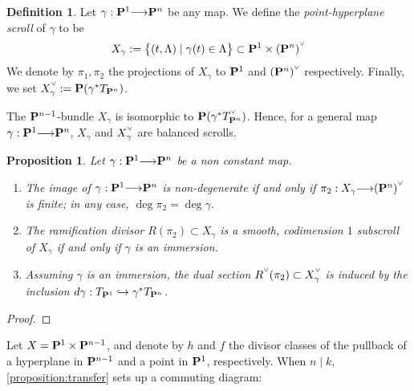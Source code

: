 \documentclass[11pt,reqno]{amsart}
\theoremstyle{plain}
\newtheorem{proposition}[theorem]{Proposition}
\theoremstyle{definition}
\newtheorem{definition}[theorem]{Definition}
\theoremstyle{remark}
\numberwithin{equation}{section}
\newcommand{\todo}[1]{\fbox{ToDo: #1}}
\renewcommand{\to}{{\longrightarrow}}
\numberwithin{equation}{section}
\newcommand{\smvee}{\raise0.5ex\hbox{$\scriptscriptstyle\vee$}}
\begin{document}
\begin{definition}\label{definition:pointlinescroll}
  Let $\gamma: \P^{1} \to \P^{n}$ be any map. We define the {\sl point-hyperplane scroll} of $\gamma$ to be 
  \begin{align*}
        X_{\gamma} := \big\{(t, \Lambda) \mid \gamma(t) \in \Lambda \big\} \subset \P^{1} \times (\P^{n})^{\smvee}
      \end{align*}
      We denote by $\pi_{1}, \pi_{2}$ the projections of $X_{\gamma}$ to $\P^{1}$ and $(\P^{n})^{\smvee}$ respectively. Finally, we set $X_{\gamma}^{\smvee} := \P(\gamma^{*}T_{\P^{n}})$.   
\end{definition}

\begin{remark}
  The $\P^{n-1}$-bundle $X_{\gamma}$ is isomorphic to $\P(\gamma^{*}T^{\smvee}_{\P^{n}})$. Hence, for a general map $\gamma: \P^{1} \to \P^{n}$, $X_{\gamma}$ and $X_{\gamma}^{\smvee}$ are balanced scrolls.
\end{remark}

\begin{proposition}\label{proposition:transfer}
 Let $\gamma: \P^{1} \to \P^{n}$ be a non constant map.

 \begin{enumerate} 
  \item The image of $\gamma: \P^{1} \to \P^{n}$ is non-degenerate if and only if $\pi_{2} : X_{\gamma} \to (\P^{n})^{\smvee}$ is finite; in any case,  $\deg \pi_{2} = \deg \gamma.$ 
  \item The ramification divisor $R(\pi_{2}) \subset X_{\gamma}$ is a smooth, codimension $1$ subscroll of $X_{\gamma}$ if and only if $\gamma$ is an immersion. 
  \item Assuming $\gamma$ is an immersion, the dual section $R^{\smvee}(\pi_{2}) \subset X^{\smvee}_{\gamma}$ is induced by the inclusion $d \gamma: T_{\P^{1}} \hookrightarrow \gamma^{*}T_{\P^{n}}$.
\end{enumerate}
\end{proposition}

\begin{proof}
  \todo{PROVE}
\end{proof}

Let $X = \P^{1} \times \P^{n-1}$, and denote by $h$ and $f$ the divisor classes of the pullback of a hyperplane in $\P^{n-1}$ and a point in $\P^{1}$, respectively.  When $n \mid k$,  \autoref{proposition:transfer} sets up a commuting diagram: 
\end{document}
